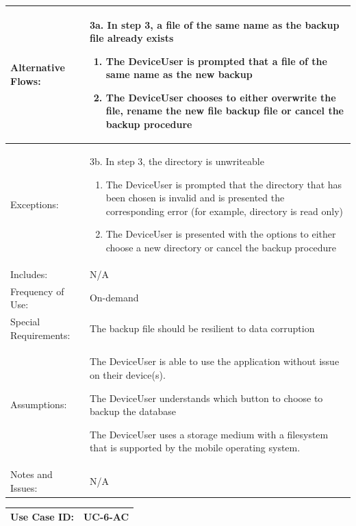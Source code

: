 \documentclass[stu]{apa7}
\newcommand{\nextitem}{\par\hspace*{\labelsep}\textbullet\hspace*{\labelsep}}
\newcommand{\nextitemblank}{\par\hspace*{\labelsep}\hspace*{\labelsep}}
\begin{document}
{\begin{xltabular}{\textwidth}{|l|X|}
  Alternative Flows: &
                       \nextitemblank 3a. In step 3, a file of the same name as the backup file already exists
                       \begin{enumerate}
                               \item The DeviceUser is prompted that a file of the same name as the new backup
                               \item The DeviceUser chooses to either overwrite the file, rename the new file backup file or cancel the backup procedure
                       \end{enumerate}
                       

              \\ \hline

  Exceptions: &
                \nextitemblank 3b. In step 3, the directory is unwriteable
                       \begin{enumerate}
                               \item The DeviceUser is prompted that the directory that has been chosen is invalid and is presented the corresponding error (for example, directory is read only)
                               \item The DeviceUser is presented with the options to either choose a new directory or cancel the backup procedure
                       \end{enumerate}
              \\ \hline
  Includes: & N/A \\ \hline

  Frequency of Use: & On-demand \\ \hline

  Special Requirements: & \nextitem The backup file should be resilient to data corruption \\ \hline

  Assumptions: & \nextitem The DeviceUser is able to use the application without issue on their device(s). \nextitem The DeviceUser understands which button to choose to backup the database \nextitem The DeviceUser uses a storage medium with a filesystem that is supported by the mobile operating system. \\ \hline

  Notes and Issues: & N/A \\ \hline

\end{xltabular}

\scriptsize{\begin{xltabular}{\textwidth}{|l|X|}
  \hline Use Case ID: & UC-6-AC \\ \hline


\end{xltabular}}}
\end{document}
